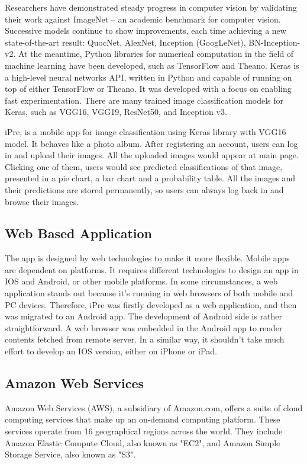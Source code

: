 \documentclass[conference]{IEEEtran}
\begin{document}
Researchers have demonstrated steady progress in computer vision by validating their work against ImageNet -- an academic benchmark for computer vision. Successive models continue to show improvements, each time achieving a new state-of-the-art result: QuocNet, AlexNet, Inception (GoogLeNet), BN-Inception-v2. At the meantime, Python libraries for numerical computation in the field of machine learning have been developed, such as TensorFlow and Theano. Keras is a high-level neural networks API, written in Python and capable of running on top of either TensorFlow or Theano. It was developed with a focus on enabling fast experimentation. There are many trained image classification models for Keras, such as VGG16\cite{vgg16}, VGG19, ResNet50\cite{resnet}, and Inception v3\cite{inception}.

iPre, is a mobile app for image classification using Keras library with VGG16 model. It behaves like a photo album. After registering an account, users can log in and upload their images. All the uploaded images would appear at main page. Clicking one of them, users would see predicted classifications of that image, presented in a pie chart, a bar chart and a probability table. All the images and their predictions are stored permanently, so users can always log back in and browse their images.

\subsection{Web Based Application}
The app is designed by web technologies to make it more flexible. Mobile apps are dependent on platforms. It requires different technologies to design an app in IOS and Android, or other mobile platforms. In some circumstances, a web application stands out because it's running in web browsers of both mobile and PC devices. Therefore, iPre was firstly developed as a web application, and then was migrated to an Android app. The development of Android side is rather straightforward. A web browser was embedded in the Android app to render contents fetched from remote server. In a similar way, it shouldn't take much effort to develop an IOS version, either on iPhone or iPad.

\subsection{Amazon Web Services}
Amazon Web Services (AWS), a subsidiary of Amazon.com, offers a suite of cloud computing services that make up an on-demand computing platform. These services operate from 16 geographical regions across the world. They include Amazon Elastic Compute Cloud, also known as "EC2", and Amazon Simple Storage Service, also known as "S3". 
\end{document}
